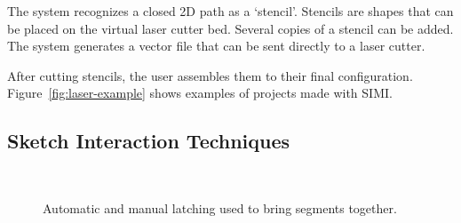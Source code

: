 \documentclass{article}
\begin{document}
The system recognizes a closed 2D path as a `stencil'. Stencils are
shapes that can be placed on the virtual laser cutter bed. Several
copies of a stencil can be added. The system generates a vector file
that can be sent directly to a laser cutter.

After cutting stencils, the user assembles them to their final
configuration. Figure~\ref{fig:laser-example} shows examples of
projects made with SIMI.

\subsection{Sketch Interaction Techniques}

\begin{figure}[h]
\centering {}\hspace{5mm}
\\
\hspace{5mm}
\caption{Automatic and manual latching used to bring segments together.}
\label{fig:latch}
\end{figure}
\end{document}
